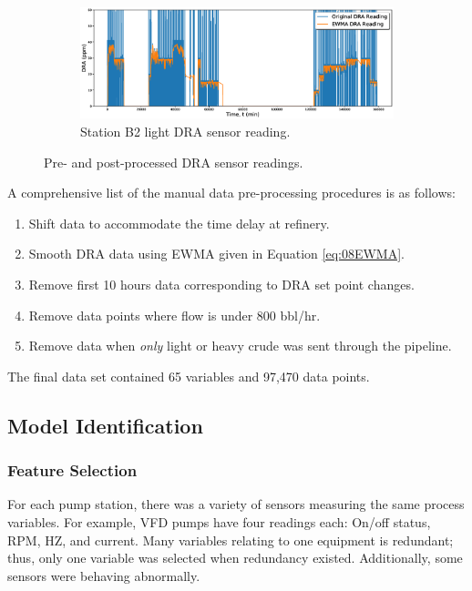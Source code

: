 \begin{figure}
\begin{subfigure}[b]{0.9\textwidth}
         \includegraphics[width=\textwidth]{images/suncor/08AultSweet.eps}
         \caption{Station B2 light DRA sensor reading.}
         \label{fig:08Station B3light}
     \end{subfigure}
        \caption{Pre- and post-processed DRA sensor readings.}
        \label{fig:08DRA}
\end{figure}

A comprehensive list of the manual data pre-processing procedures is as follows:
\begin{enumerate}
    \item Shift data to accommodate the time delay at refinery.
    \item Smooth DRA data using EWMA given in Equation \ref{eq:08EWMA}.  
    \item Remove first 10 hours data corresponding to DRA set point changes.
    \item Remove data points where flow is under 800 bbl/hr.
    \item Remove data when \textit{only} light or heavy crude was sent through the pipeline.
\end{enumerate}

The final data set contained 65 variables and 97,470 data points.

\subsection{Model Identification}
\subsubsection{Feature Selection}
For each pump station, there was a variety of sensors measuring the same process variables.  For example, VFD pumps have four readings each: On/off status, RPM, HZ, and current. Many variables relating to one equipment is redundant; thus, only one variable was selected when redundancy existed. Additionally, some sensors were behaving abnormally.

